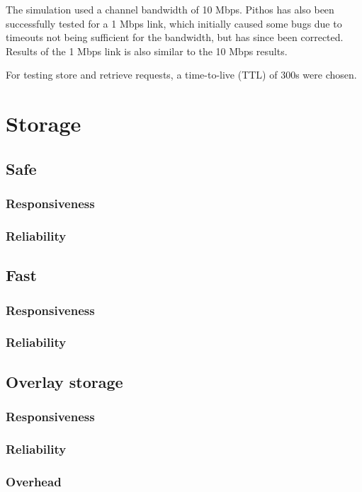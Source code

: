 The simulation used a channel bandwidth of 10 Mbps. Pithos has also been successfully tested for a 1 Mbps link, which initially caused some bugs due to timeouts not being sufficient for the bandwidth, but has since been corrected. Results of the 1 Mbps link is also similar to the 10 Mbps results.

For testing store and retrieve requests, a time-to-live (TTL) of 300s were chosen.

    \section{Storage}
            \subsection{Safe}
                \subsubsection{Responsiveness}


                \subsubsection{Reliability}
                        \label{reliability_compare_storage}
            \subsection{Fast}
                \subsubsection{Responsiveness}
                \subsubsection{Reliability}
            \subsection{Overlay storage}
                \subsubsection{Responsiveness}
                \subsubsection{Reliability}
                \subsubsection{Overhead}
